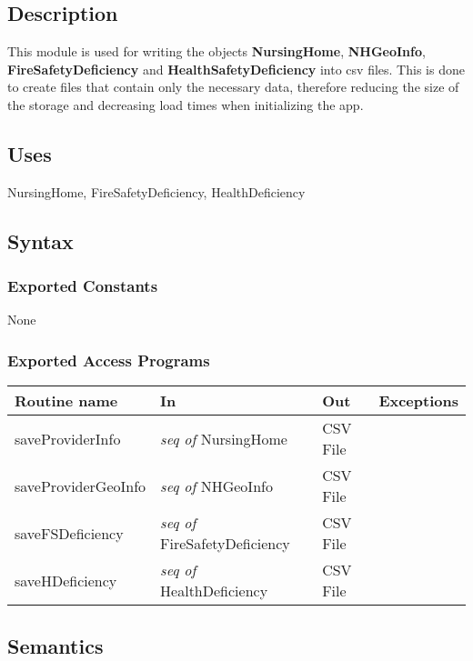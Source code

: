 \documentclass[12pt]{article}
\begin{document}
\subsection*{Description}

This module is used for writing the objects \textbf{NursingHome}, \textbf{NHGeoInfo}, \textbf{FireSafetyDeficiency} and \textbf{HealthSafetyDeficiency} into csv files. This is done to create files that contain only the necessary data, therefore reducing the size of the storage and decreasing load times when initializing the app. 

\subsection* {Uses}

NursingHome, FireSafetyDeficiency, HealthDeficiency

\subsection* {Syntax}

\subsubsection* {Exported Constants}

None

\subsubsection* {Exported Access Programs}

\begin{tabular}{| l | l | l | p{5cm} |}
\hline
\textbf{Routine name} & \textbf{In} & \textbf{Out} & \textbf{Exceptions}\\
\hline
saveProviderInfo & \textit{seq of} NursingHome &  CSV File & \\
\hline
saveProviderGeoInfo & \textit{seq of} NHGeoInfo &  CSV File & \\
\hline
saveFSDeficiency &  \textit{seq of} FireSafetyDeficiency &  CSV File & \\
\hline
saveHDeficiency & \textit{seq of} HealthDeficiency &  CSV File &  \\
\hline
\end{tabular}

\subsection* {Semantics}
\end{document}

